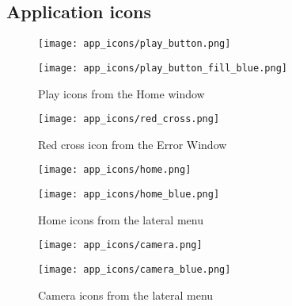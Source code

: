 \begin{appendices}
\chapter{Application icons}
\label{ch:appendix_a}

\begin{figure*}[h!t]
	\centering
	\begin{multicols}{4}
		\hspace{\linewidth} 
	    \texttt{[image: app\_icons/play\_button.png]}\par 
	    \texttt{[image: app\_icons/play\_button\_fill\_blue.png]}\par 
	    \hspace{\linewidth}
    \end{multicols}
	\caption{Play icons from the Home window}
\end{figure*}

\begin{figure*}[h!t]
	\centering
	\texttt{[image: app\_icons/red\_cross.png]}
	\caption{Red cross icon from the Error Window}
\end{figure*}

\begin{figure*}[h!t]
	\centering
	\begin{multicols}{4}
		\hspace{\linewidth} 
	    \texttt{[image: app\_icons/home.png]}\par 
	    \texttt{[image: app\_icons/home\_blue.png]}\par 
	    \hspace{\linewidth}
    \end{multicols}
	\caption{Home icons from the lateral menu}
\end{figure*}


\begin{figure*}[h!t]
	\centering
	\begin{multicols}{4}
		\hspace{\linewidth} 
	    \texttt{[image: app\_icons/camera.png]}\par 
	    \texttt{[image: app\_icons/camera\_blue.png]}\par 
	    \hspace{\linewidth}
    \end{multicols}
	\caption{Camera icons from the lateral menu}
\end{figure*}


\end{appendices}
